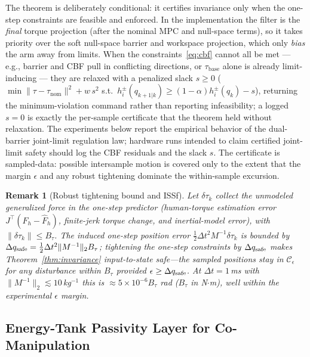 \documentclass[journal]{IEEEtran}
\newtheorem{remark}{Remark}
\begin{document}
The theorem is deliberately conditional: it certifies invariance only
when the one-step constraints are feasible and enforced. In the
implementation the filter is the \emph{final} torque projection (after the
nominal MPC and null-space terms), so it takes priority over the soft
null-space barrier and workspace projection, which only \emph{bias} the
arm away from limits. When the constraints~\eqref{eq:cbf} cannot all be
met --- e.g., barrier and CBF pull in conflicting directions, or
$\tau_{\text{base}}$ alone is already limit-inducing --- they are relaxed
with a penalized slack $s\ge0$ ($\min\|\tau-\tau_{\text{nom}}\|^2+w\,s^2$
s.t.\ $h_i^\pm(q_{k+1|k})\ge(1-\alpha)h_i^\pm(q_k)-s$), returning the
minimum-violation command rather than reporting infeasibility; a logged
$s=0$ is exactly the per-sample certificate that the theorem held without
relaxation. The experiments
below report the empirical behavior of the dual-barrier joint-limit
regulation law;
hardware runs intended to claim certified joint-limit safety should log
the CBF residuals and the slack $s$. The certificate is sampled-data:
possible intersample motion is covered only to the extent that the margin
$\epsilon$ and any robust tightening dominate the within-sample excursion.

\begin{remark}[Robust tightening bound and ISSf]
Let $\delta\tau_k$ collect the unmodeled generalized force in the one-step
predictor (human-torque estimation error $J^\top(F_h-\hat F_h)$, finite-jerk
torque change, and inertial-model error), with $\|\delta\tau_k\|\le B_\tau$. The
induced one-step position error $\tfrac12\Delta t^2 M^{-1}\delta\tau_k$ is bounded
by $\Delta q_{\rm safe}=\tfrac12\Delta t^2\|M^{-1}\|_2 B_\tau$; tightening the
one-step constraints by $\Delta q_{\rm safe}$ makes
Theorem~\ref{thm:invariance} \emph{input-to-state safe}---the sampled positions
stay in $\mathcal C_\epsilon$ for any disturbance within $B_\tau$ provided
$\epsilon\ge\Delta q_{\rm safe}$. At $\Delta t=1$\,ms with
$\|M^{-1}\|_2\lesssim10$\,kg$^{-1}$ this is $\approx5\times10^{-6}B_\tau$ rad
($B_\tau$ in N$\cdot$m), well within the experimental $\epsilon$ margin.
\end{remark}

\subsection{Energy-Tank Passivity Layer for Co-Manipulation}\label{sec:passivity}
\end{document}
